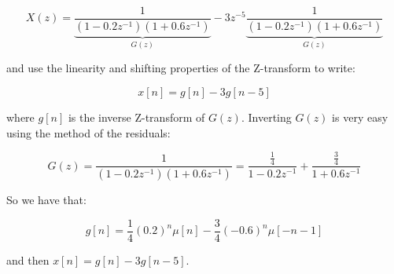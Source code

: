 \documentclass[a4paper,11pt,oneside]{article}
\begin{document}
\[
X(z)=\underbrace{\frac{1}{(1-0.2z^{-1})(1+0.6z^{-1})}}_{G(z)}-3z^{-5}\underbrace{\frac{1}{(1-0.2z^{-1})(1+0.6z^{-1})}}_{G(z)}
\]

and use the linearity and shifting properties of the Z-transform to write:

\[
x[n] = g[n] - 3g[n-5]
\]

where $g[n]$ is the inverse Z-transform of $G(z)$. Inverting $G(z)$ is very easy using the method of the residuals:

\[
G(z) = \frac{1}{(1-0.2z^{-1})(1+0.6z^{-1})}=\frac{\frac{1}{4}}{1-0.2z^{-1}}+\frac{\frac{3}{4}}{1+0.6z^{-1}}
\]

So we have that:

\[
g[n]=\frac{1}{4}(0.2)^n \mu[n]-\frac{3}{4}(-0.6)^n\mu[-n-1]
\]

and then $x[n] = g[n] - 3g[n-5]$.
\end{document}
